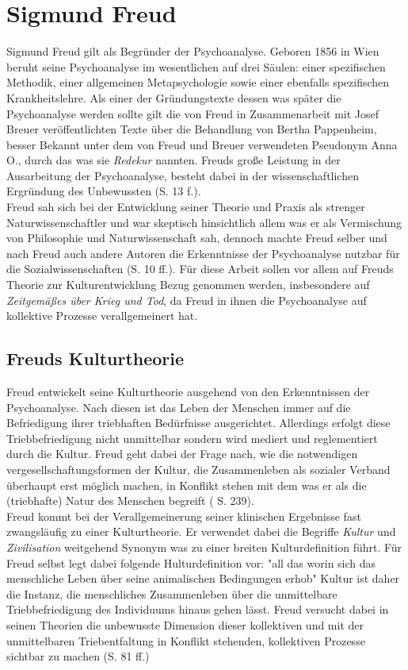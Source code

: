 \documentclass[11pt,a4paper,oneside,numbers=noenddot,bibliography=totocnumbered,DIV=13]{scrartcl}
\begin{document}
\section{Sigmund Freud}
Sigmund Freud gilt als Begründer der Psychoanalyse. 
Geboren 1856 in Wien beruht seine Psychoanalyse im wesentlichen auf drei Säulen: einer spezifischen Methodik, einer allgemeinen Metapsychologie sowie einer ebenfalls spezifischen Krankheitslehre. 
Als einer der Gründungstexte dessen was später die Psychoanalyse werden sollte gilt die von Freud in Zusammenarbeit mit Josef Breuer veröffentlichten Texte über die Behandlung von Bertha Pappenheim, besser Bekannt unter dem von Freud und Breuer verwendeten Pseudonym Anna O., durch das was sie \textit{Redekur} nannten.
Freuds große Leistung in der Ausarbeitung der Psychoanalyse, besteht dabei in der wissenschaftlichen Ergründung des Unbewussten (\cite{berkel_sigmund_2008}S. 13 f.).\\
Freud sah sich bei der Entwicklung seiner Theorie und Praxis als strenger Naturwissenschaftler und war skeptisch hinsichtlich allem was er als Vermischung von Philosophie und Naturwissenschaft sah, dennoch machte Freud selber und nach Freud auch andere Autoren die Erkenntnisse der Psychoanalyse nutzbar für die Sozialwissenschaften (\cite{lohmann_freud-handbuch:_2013}S. 10 ff.).
Für diese Arbeit sollen vor allem auf Freuds Theorie zur Kulturentwicklung Bezug genommen werden, insbesondere auf \textit{Zeitgemäßes über Krieg und Tod}, da Freud in ihnen die Psychoanalyse auf kollektive Prozesse verallgemeinert hat.        
\subsection{Freuds Kulturtheorie}
Freud entwickelt seine Kulturtheorie ausgehend von den Erkenntnissen der Psychoanalyse. Nach diesen ist das Leben der Menschen immer auf die Befriedigung ihrer triebhaften Bedürfnisse ausgerichtet. 
Allerdings erfolgt diese Triebbefriedigung nicht unmittelbar sondern wird mediert und reglementiert durch die Kultur. Freud geht dabei der Frage nach, wie die notwendigen vergesellschaftungsformen der Kultur, die Zusammenleben als sozialer Verband überhaupt erst möglich machen, in Konflikt stehen  mit dem was er als die (triebhafte) Natur des Menschen begreift (\cite{lohmann_freud-handbuch:_2013} S. 239). \\
Freud kommt bei der Verallgemeinerung seiner klinischen Ergebnisse fast zwangsläufig zu einer Kulturtheorie. 
Er verwendet dabei die Begriffe \textit{Kultur} und \textit{Zivilisation} weitgehend Synonym was zu einer breiten Kulturdefinition führt. 
Für Freud selbst legt dabei folgende Hulturdefinition vor: "all das worin sich das menschliche Leben über seine animalischen Bedingungen erhob"
Kultur ist daher die Instanz, die menschliches Zusammenleben über die unmittelbare Triebbefriedigung des Individuums hinaus gehen lässt. Freud versucht dabei in seinen Theorien die unbewusste Dimension dieser kollektiven und mit der unmittelbaren Triebentfaltung in Konflikt stehenden, kollektiven Prozesse sichtbar zu machen (\cite{berkel_sigmund_2008}S. 81 ff.)\\
\end{document}
